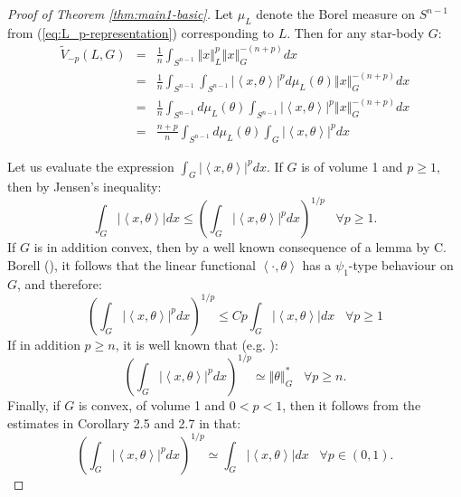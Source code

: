 \documentclass[12pt,oneside]{amsart}
\theoremstyle{definition}
\theoremstyle{remark}
\theoremstyle{proof}
\numberwithin{equation}{section}
\newcommand{\norm}[1]{\left\Vert#1\right\Vert}
\newcommand{\abs}[1]{\left\vert#1\right\vert}
\newcommand{\brac}[1]{\left(#1\right)}
\newcommand{\scalar}[1]{\left \langle #1 \right \rangle}
\newcommand{\abscalar}[1]{\abs{\scalar{#1}}}
\newcommand{\Real}{\mathbb{R}}
\begin{document}
\begin{proof}[Proof of Theorem \ref{thm:main1-basic}]

Let $\mu_L$ denote the Borel measure on $S^{n-1}$ from
(\ref{eq:L_p-representation}) corresponding to $L$. Then for any
star-body $G$:
\begin{eqnarray}
\nonumber \widetilde{V}_{-p}(L,G) & = & \frac{1}{n} \int_{S^{n-1}}
\norm{x}_L^p \norm{x}_G^{-(n+p)} dx \\
\nonumber & = & \frac{1}{n} \int_{S^{n-1}} \int_{S^{n-1}} \abscalar{x,\theta}^p d\mu_L(\theta) \norm{x}_G^{-(n+p)} dx \\
\nonumber & = & \frac{1}{n} \int_{S^{n-1}} d\mu_L(\theta)
\int_{S^{n-1}} \abscalar{x,\theta}^p \norm{x}_G^{-(n+p)} dx \\
\label{eq:fubini1} & = & \frac{n+p}{n} \int_{S^{n-1}}
d\mu_L(\theta) \int_{G} \abscalar{x,\theta}^p dx
\end{eqnarray}


Let us evaluate the expression $\int_{G} \abscalar{x,\theta}^p
dx$. If $G$ is of volume 1 and $p\geq 1$, then by Jensen's
inequality:
\begin{equation} \label{eq:lp-jensen}
\int_G \abscalar{x,\theta} dx \leq \brac{ \int_G
\abscalar{x,\theta}^p dx }^{1/p} \;\;\; \forall p\geq 1.
\end{equation}
If $G$ is in addition convex, then by a well known consequence of
a lemma by C. Borell (\cite{Borell-lemma}), it follows that the
linear functional $\scalar{\cdot,\theta}$ has a $\psi_1$-type
behaviour on $G$, and therefore:
\begin{equation} \label{eq:psi1}
\brac{ \int_G \abscalar{x,\theta}^p dx } ^ {1/p} \leq C p \int_G
\abscalar{x,\theta} dx \;\;\; \forall p \geq 1
\end{equation}
If in addition $p\geq n$, it is well known that (e.g. \cite[Lemma
4.1]{Paouris-Small-Diameter}):
\begin{equation} \label{eq:max-norm}
\brac{ \int_G \abscalar{x,\theta}^p dx } ^ {1/p} \simeq
\norm{\theta}^*_G \;\;\; \forall p \geq n.
\end{equation}
Finally, if $G$ is convex, of volume 1 and $0<p<1$, then it
follows from the estimates in Corollary 2.5 and 2.7 in
\cite{Milman-Pajor-LK} that:
\begin{equation} \label{eq:p-leq-1}
\brac{ \int_G \abscalar{x,\theta}^p dx } ^ {1/p} \simeq \int_G
\abscalar{x,\theta} dx \;\;\; \forall p\in(0,1).
\end{equation}


\end{proof}
\end{document}
